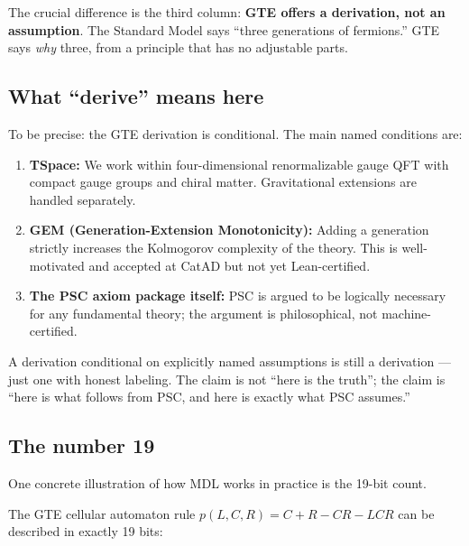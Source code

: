 \documentclass[11pt,a4paper]{article}
\begin{document}
\bigskip

The crucial difference is the third column: \textbf{GTE offers a derivation, not an
assumption}.  The Standard Model says ``three generations of fermions.''
GTE says \emph{why} three, from a principle that has no adjustable parts.

\subsection{What ``derive'' means here}

To be precise: the GTE derivation is conditional.  The main named conditions are:

\begin{enumerate}[leftmargin=2em,itemsep=4pt]
\item \textbf{TSpace:} We work within four-dimensional renormalizable gauge QFT with
  compact gauge groups and chiral matter.  Gravitational extensions are handled separately.

\item \textbf{GEM (Generation-Extension Monotonicity):} Adding a generation strictly
  increases the Kolmogorov complexity of the theory.  This is well-motivated and
  accepted at CatAD but not yet Lean-certified.

\item \textbf{The PSC axiom package itself:} PSC is argued to be logically necessary
  for any fundamental theory; the argument is philosophical, not machine-certified.
\end{enumerate}

A derivation conditional on explicitly named assumptions is still a derivation — just
one with honest labeling.  The claim is not ``here is the truth''; the claim is
``here is what follows from PSC, and here is exactly what PSC assumes.''

\subsection{The number 19}

One concrete illustration of how MDL works in practice is the 19-bit count.

The GTE cellular automaton rule $p(L,C,R) = C + R - CR - LCR$ can be described in
exactly 19 bits:
\end{document}
